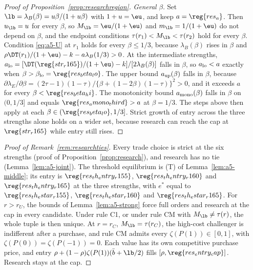 \begin{proof}[Proof of Proposition~\ref{prop:researchregion}]
\emph{General \(\beta\).} Set \(\lb=\lambda_B(\beta)=u\beta/(1+u\beta)\) with \(1+u=\eu\), and keep \(a=\reg{res_a}\).
Then \(u_{\lb}=u\) for every \(\beta\), so \(M_{\lb}=\eu/(1+\eu)\) and \(m_{\lb}=1/(1+\eu)\) do not depend on \(\beta\),
and the endpoint conditions \(\tau(r_1)<M_{\lb}<\tau(r_2)\) hold for every \(\beta\). Condition \eqref{eq:a5-U} at
\(r_1\) holds for every \(\beta\le1/3\), because \(\lambda_B(\beta)\) rises in \(\beta\) and
\(\rho\DT(r_1)/(1+\eu)-k-a\lambda_B(1/3)>0\). At the intermediate strengths,
\(a_{\rm lo}=[\DT(\reg{str_r165})/(1+\eu)-k]/[2\lambda_B(\beta)]\) falls in \(\beta\), so \(a_{\rm lo}<a\) exactly when
\(\beta>\beta_{\rm lo}=\reg{res_beta_lo}\). The upper bound \(a_{\rm up}(\beta)\) falls in \(\beta\), because
\(\partial\lambda_E/\partial\beta=(2\tau-1)(1-\tau)/\{\beta+(1-2\beta)(1-\tau)\}^2>0\), and it exceeds \(a\) for every
\(\beta<\reg{res_beta_hi}\). The monotonicity bound \(a_{\rm mono}(\beta)\) falls in \(\beta\) on \((0,1/3]\) and equals
\(\reg{res_amono_third}>a\) at \(\beta=1/3\). The steps above then apply at each \(\beta\in(\reg{res_beta_lo},1/3]\).
Strict growth of entry across the three strengths alone holds on a wider set, because research can reach the cap at
\(\reg{str_r165}\) while entry still rises.
\end{proof}

\begin{proof}[Proof of Remark~\ref{rem:researchties}]
Every trade choice is strict at the six strengths (proof of Proposition~\ref{prop:research}), and research has no
tie (Lemma~\ref{lem:a5-joint}). The threshold equilibrium is (T) of Lemma~\ref{lem:a5-middle}; its entry is
\(\reg{res_th_entry_r155}\), \(\reg{res_th_entry_r160}\) and \(\reg{res_th_entry_r165}\) at the three strengths, with
\(e^*\) equal to \(\reg{res_th_estar_r155}\), \(\reg{res_th_estar_r160}\) and \(\reg{res_th_estar_r165}\). For
\(r>r_U\), the bounds of Lemma~\ref{lem:a5-strong} force full orders and research at the cap in every candidate.
Under rule C1, or under rule CM with \(M_{\lb}\ne\tau(r)\), the whole tuple is then unique. At \(r=r_C\),
\(M_{\lb}=\tau(r_C)\), the high-cost challenger is indifferent after a purchase, and rule CM admits every
\(\zeta(P(1))\in[0,1]\), with \(\zeta(P(0))=\zeta(P(-1))=0\). Each value has its own competitive purchase price, and
entry \(\rho+(1-\rho)\zeta(P(1))(\bar b+\lb/2)\) fills \([\rho,\reg{res_entry_cap}]\). Research stays at the cap.
\end{proof}

